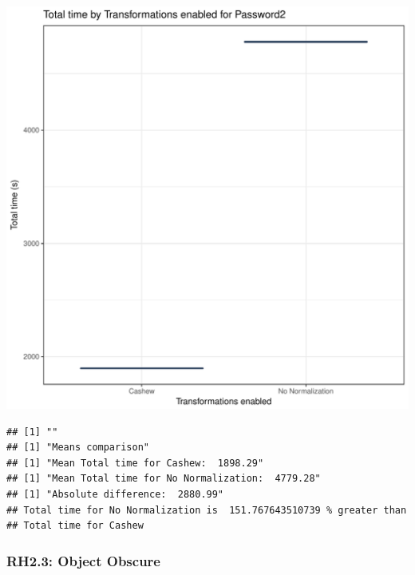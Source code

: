 \documentclass{article}\usepackage[]{graphicx}\usepackage[]{color}
\makeatletter
\def\maxwidth{ %
  \ifdim\Gin@nat@width>\linewidth
    \linewidth
  \else
    \Gin@nat@width
  \fi
}
\newenvironment{kframe}{%
 \def\at@end@of@kframe{}%
 \ifinner\ifhmode%
  \def\at@end@of@kframe{\end{minipage}}%
  \begin{minipage}{\columnwidth}%
 \fi\fi%
 \def\FrameCommand##1{\hskip\@totalleftmargin \hskip-\fboxsep
 \colorbox{shadecolor}{##1}\hskip-\fboxsep
     \hskip-\linewidth \hskip-\@totalleftmargin \hskip\columnwidth}%
 \MakeFramed {\advance\hsize-\width
   \@totalleftmargin\z@ \linewidth\hsize
   \@setminipage}}%
 {\par\unskip\endMakeFramed%
 \at@end@of@kframe}
\newenvironment{knitrout}{}{} %
\makeatother
\begin{document}
\begin{knitrout}
\color{fgcolor}
\includegraphics[width=\maxwidth]{figure/RH2_password2-1} 
\begin{kframe}

{\ttfamily\noindent\bfseries\color{errorcolor}{\#\# Error in eval(expr, envir, enclos): object 'shap\_cashew\_password2' not found}}\begin{verbatim}
## [1] ""
## [1] "Means comparison"
## [1] "Mean Total time for Cashew:  1898.29"
## [1] "Mean Total time for No Normalization:  4779.28"
## [1] "Absolute difference:  2880.99"
## Total time for No Normalization is  151.767643510739 % greater than 
## Total time for Cashew
\end{verbatim}
\end{kframe}
\end{knitrout}


\subsubsection{RH2.3: Object Obscure}
\end{document}
